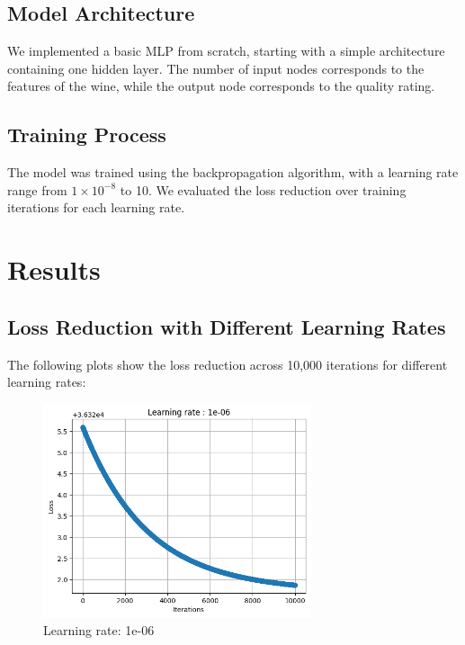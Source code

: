\documentclass[12pt]{article}
\begin{document}
\subsection{Model Architecture}
We implemented a basic MLP from scratch, starting with a simple architecture containing one hidden layer. The number of input nodes corresponds to the features of the wine, while the output node corresponds to the quality rating.

\subsection{Training Process}
The model was trained using the backpropagation algorithm, with a learning rate range from $1 \times 10^{-8}$ to 10. We evaluated the loss reduction over training iterations for each learning rate.

\section{Results}
\subsection{Loss Reduction with Different Learning Rates}
The following plots show the loss reduction across 10,000 iterations for different learning rates:

\begin{figure}[h!]
    \centering
    \includegraphics[width=0.7\textwidth]{plot_28.png}
    \caption{Learning rate: 1e-06}
    \label{fig:lr1e-06}
\end{figure}
\end{document}
